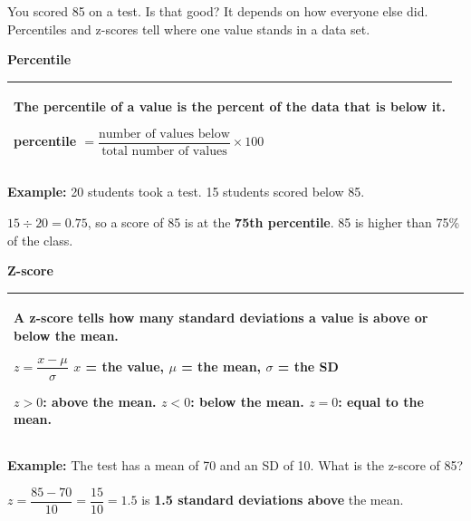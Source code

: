 \documentclass[11pt]{article}
\begin{document}

You scored 85 on a test. Is that good? It depends on how everyone else did.
Percentiles and z-scores tell where one value stands in a data set.

\vspace{0.6em}
\textbf{Percentile}

\vspace{0.2em}
\renewcommand{\arraystretch}{1.3}
\begin{tabular}{|>{\raggedright\arraybackslash}p{6.7in}|}\hline
The \textbf{percentile} of a value is the percent of the data that is \textbf{below} it.\par\vspace{0.3em}
\hspace*{1.5in}percentile $= \dfrac{\text{number of values below}}{\text{total number of values}} \times 100$\\[1.2em] \hline
\end{tabular}

\vspace{0.4em}
\textbf{Example:} 20 students took a test. 15 students scored below 85.

\vspace{0.2em}
$15 \div 20 = 0.75$, so a score of 85 is at the \textbf{75th percentile}. 85 is higher than 75\% of the class.

\vspace{1em}
\textbf{Z-score}

\vspace{0.2em}
\begin{tabular}{|>{\raggedright\arraybackslash}p{6.7in}|}\hline
A \textbf{z-score} tells how many standard deviations a value is above or below the mean.\par\vspace{0.3em}
\hspace*{1.2in}$z = \dfrac{x - \mu}{\sigma}$ \qquad $x$ = the value, \; $\mu$ = the mean, \; $\sigma$ = the SD\par\vspace{0.4em}
$z > 0$: above the mean. \qquad $z < 0$: below the mean. \qquad $z = 0$: equal to the mean.\\ \hline
\end{tabular}

\vspace{0.4em}
\textbf{Example:} The test has a mean of 70 and an SD of 10. What is the z-score of 85?

\vspace{0.2em}
$z = \dfrac{85 - 70}{10} = \dfrac{15}{10} = 1.5$  is \textbf{1.5 standard deviations above} the mean.
\end{document}
